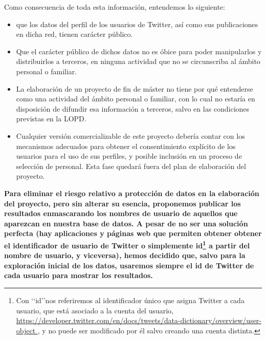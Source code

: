Como consecuencia de toda esta información, entendemos lo siguiente:
\begin{itemize}
\item que los datos del perfil de los usuarios de Twitter, así como sus publicaciones en dicha red,
tienen carácter público.
\item Que el carácter público de dichos datos no es óbice para poder manipularlos y distribuirlos
a terceros, en ninguna actividad que no se circunscriba al ámbito personal o familiar.
\item La elaboración de un proyecto de fin de máster no tiene por qué entenderse como una 
actividad del ámbito personal o familiar, con lo cual no estaría en disposición de difundir esa información
a terceros, salvo en las condiciones previstas en la LOPD.
\item Cualquier versión comercializable de este proyecto debería contar con los mecanismos
adecuados para obtener el consentimiento explícito de los usuarios para el uso de sus perfiles, 
y posible inclusión en un proceso de selección de personal. Esta fase quedará fuera del plan de elaboración
del proyecto.
\end{itemize}
{\bf\color{oblue}
\label{note:why_only_user_id}
Para eliminar el riesgo relativo a protección de datos en la elaboración del proyecto, 
pero sin alterar su esencia, proponemos publicar los resultados enmascarando los nombres 
de usuario de aquellos que aparezcan en nuestra base de datos. A pesar de no ser una solución
perfecta (hay aplicaciones y páginas web que permiten obtener obtener el identificador de usuario
de Twitter o simplemente id\footnote{Con \lq\lq id\rq\rq nos referiremos al identificador único 
que asigna Twitter a cada usuario, que está asociado a la cuenta del usuario, \url{https://developer.twitter.com/en/docs/tweets/data-dictionary/overview/user-object },
y no puede ser modificado por él salvo creando una cuenta distinta.}
a partir del nombre de usuario, y viceversa), hemos decidido que, salvo 
para la exploración inicial de los datos, usaremos siempre el id de Twitter de
cada usuario para mostrar los resultados. }

